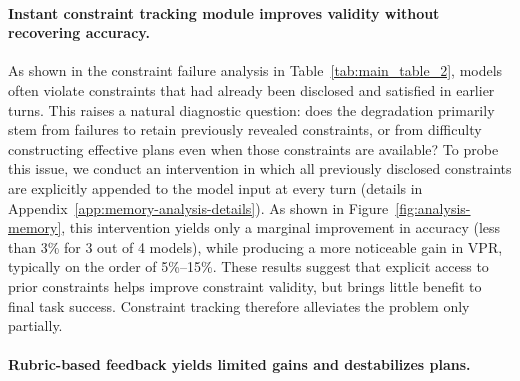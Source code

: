 \documentclass{llmxive}
\begin{document}
\paragraph{Instant constraint tracking module improves validity without recovering accuracy.}
As shown in the constraint failure analysis in Table~\ref{tab:main_table_2}, models often violate constraints that had already been disclosed and satisfied in earlier turns. 
This raises a natural diagnostic question: does the degradation primarily stem from failures to retain previously revealed constraints, or from difficulty constructing effective plans even when those constraints are available?
To probe this issue, we conduct an intervention in which all previously disclosed constraints are explicitly appended to the model input at every turn (details in Appendix~\ref{app:memory-analysis-details}). As shown in Figure~\ref{fig:analysis-memory}, this intervention yields only a marginal improvement in accuracy (less than 3\% for 3 out of 4 models), while producing a more noticeable gain in VPR, typically on the order of 5\%--15\%. 
These results suggest that explicit access to prior constraints helps improve constraint validity, but brings little benefit to final task success. 
Constraint tracking therefore alleviates the problem only partially.

\paragraph{Rubric-based feedback yields limited gains and destabilizes plans.}

\end{document}

